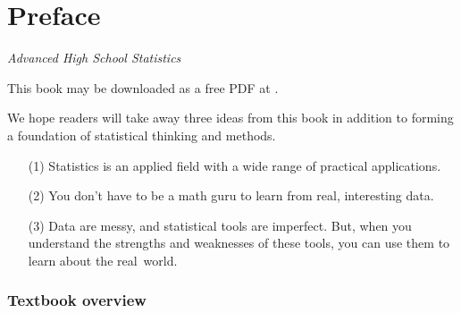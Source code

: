 \chapter*{{\color{oiB}Preface}\vspace{-6mm}}

\noindent%
\emph{Advanced High School Statistics} 
\vspace{3mm}

\noindent%
This book may be downloaded as a free PDF at .
\vspace{3mm}

\noindent%
We hope readers will take away three ideas from this book in addition to forming a foundation of statistical thinking and methods.\vspace{-1mm}
\begin{enumerate}
\setlength{\itemsep}{0mm}
\item[(1)] Statistics is an applied field with a wide range of practical applications.
\item[(2)] You don't have to be a math guru to learn from real, interesting data.
\item[(3)] Data are messy, and statistical tools are imperfect. But, when you understand the strengths and weaknesses of these tools, you can use them to learn about the real~world.
\end{enumerate}


\subsection*{{\color{oiB}Textbook overview}}


